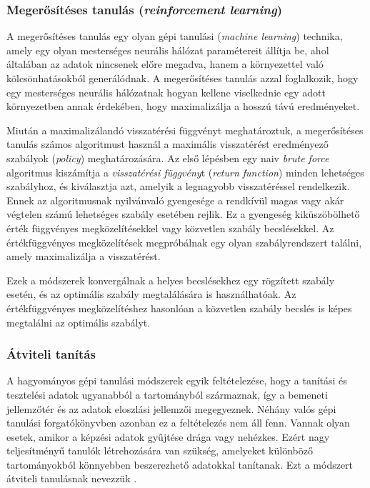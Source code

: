 \documentclass[12pt,a4]{article}
\begin{document}
	\subsubsection{Megerősítéses tanulás (\textit{reinforcement learning})}
	
	A megerősítéses tanulás \cite{krenker} egy olyan gépi tanulási (\textit{machine learning}) technika, amely egy olyan
	mesterséges neurális hálózat paramétereit állítja be, ahol általában az adatok nincsenek előre megadva, hanem a környezettel való kölcsönhatásokból generálódnak. A megerősítéses tanulás azzal foglalkozik, hogy egy mesterséges neurális hálózatnak hogyan kellene viselkednie egy adott környezetben annak érdekében, hogy maximalizálja a hosszú távú 
	eredményeket.
	
	Miután a maximalizálandó visszatérési függvényt meghatároztuk, a megerősítéses tanulás számos algoritmust használ a maximális visszatérést eredményező szabályok (\textit{policy}) meghatározására. Az első lépésben egy naiv \textit{brute force} algoritmus kiszámítja a \textit{visszatérési függvény}t (\textit{return function}) minden lehetséges szabályhoz, és kiválasztja azt, amelyik a legnagyobb visszatéréssel rendelkezik. Ennek az algoritmusnak nyilvánvaló gyengesége a rendkívül magas vagy akár végtelen számú lehetséges szabály esetében rejlik. Ez a gyengeség kiküszöbölhető érték függvényes megközelítésekkel vagy közvetlen szabály becslésekkel. Az értékfüggvényes megközelítések megpróbálnak
	egy olyan szabályrendszert találni, amely maximalizálja a visszatérést.
	
	Ezek a módszerek konvergálnak a helyes becslésekhez egy rögzített szabály esetén, és az optimális szabály megtalálására is használhatóak. Az értékfüggvényes megközelítéshez hasonlóan a közvetlen szabály becslés is képes megtalálni az optimális szabályt.

    \subsubsection{Átviteli tanítás}
    
     A hagyományos gépi tanulási módszerek egyik feltételezése, hogy a tanítási és tesztelési adatok ugyanabból a tartományból származnak, így a bemeneti jellemzőtér és az adatok eloszlási jellemzői megegyeznek. Néhány valós gépi tanulási forgatókönyvben azonban ez a feltételezés nem áll fenn. Vannak olyan esetek, amikor a képzési adatok gyűjtése drága vagy nehézkes. Ezért nagy teljesítményű tanulók létrehozására van szükség, amelyeket különböző tartományokból könnyebben beszerezhető adatokkal tanítanak. Ezt a módszert átviteli tanulásnak nevezzük \cite{tl}.
\end{document}
